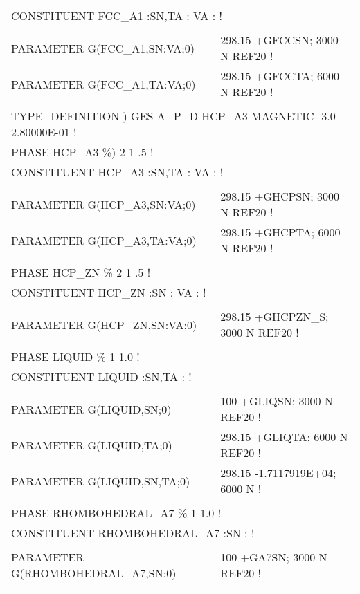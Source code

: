 \begin{longtable}[H]{ l l l }
	\multicolumn{3}{l}{CONSTITUENT FCC\_A1  :SN,TA : VA :  !}\\
	& & \\
	PARAMETER G(FCC\_A1,SN:VA;0) & \multicolumn{2}{l}{298.15 +GFCCSN; 3000 N REF20 !}\\
	PARAMETER G(FCC\_A1,TA:VA;0) & \multicolumn{2}{l}{298.15 +GFCCTA; 6000 N REF20 !}\\
	& & \\
	\multicolumn{3}{l}{TYPE\_DEFINITION ) GES A\_P\_D HCP\_A3 MAGNETIC  -3.0    2.80000E-01 !}\\
	\multicolumn{3}{l}{PHASE HCP\_A3  \%)  2 1   .5 !}\\
	\multicolumn{3}{l}{CONSTITUENT HCP\_A3  :SN,TA : VA :  !}\\
	& & \\
	PARAMETER G(HCP\_A3,SN:VA;0) & \multicolumn{2}{l}{298.15 +GHCPSN; 3000 N REF20 !}\\
	PARAMETER G(HCP\_A3,TA:VA;0) & \multicolumn{2}{l}{298.15 +GHCPTA; 6000 N REF20 !}\\
	& & \\
	\multicolumn{3}{l}{PHASE HCP\_ZN  \%  2 1   .5 !}\\
	\multicolumn{3}{l}{CONSTITUENT HCP\_ZN  :SN : VA :  !}\\
	& & \\
	PARAMETER G(HCP\_ZN,SN:VA;0) & \multicolumn{2}{l}{298.15 +GHCPZN\_S; 3000 N REF20 !}\\
	& & \\
	\multicolumn{3}{l}{PHASE LIQUID  \%  1  1.0  !}\\
	\multicolumn{3}{l}{CONSTITUENT LIQUID  :SN,TA :  !}\\
	& & \\
	PARAMETER G(LIQUID,SN;0) & \multicolumn{2}{l}{100 +GLIQSN; 3000 N REF20 !}\\
	PARAMETER G(LIQUID,TA;0) & \multicolumn{2}{l}{298.15 +GLIQTA; 6000 N REF20 !}\\
	PARAMETER G(LIQUID,SN,TA;0) & \multicolumn{2}{l}{298.15 -1.7117919E+04; 6000 N !}\\
	& & \\
	\multicolumn{3}{l}{PHASE RHOMBOHEDRAL\_A7  \%  1  1.0  !}\\
	\multicolumn{3}{l}{CONSTITUENT RHOMBOHEDRAL\_A7  :SN :  !}\\
	& & \\
	PARAMETER G(RHOMBOHEDRAL\_A7,SN;0) & \multicolumn{2}{l}{100 +GA7SN; 3000 N REF20 !}\\
	& & \\

\end{longtable}

